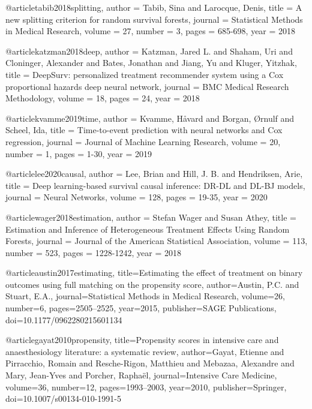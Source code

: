 @article{tabib2018splitting,
  author = {Tabib, Sina and Larocque, Denis},
  title = {A new splitting criterion for random survival forests},
  journal = {Statistical Methods in Medical Research},
  volume = {27},
  number = {3},
  pages = {685-698},
  year = {2018}
}


@article{katzman2018deep,
  author = {Katzman, Jared L. and Shaham, Uri and Cloninger, Alexander and Bates, Jonathan and Jiang, Yu and Kluger, Yitzhak},
  title = {DeepSurv: personalized treatment recommender system using a Cox proportional hazards deep neural network},
  journal = {BMC Medical Research Methodology},
  volume = {18},
  pages = {24},
  year = {2018}
}

@article{kvamme2019time,
  author = {Kvamme, Håvard and Borgan, Ørnulf and Scheel, Ida},
  title = {Time-to-event prediction with neural networks and Cox regression},
  journal = {Journal of Machine Learning Research},
  volume = {20},
  number = {1},
  pages = {1-30},
  year = {2019}
}

@article{lee2020causal,
  author = {Lee, Brian and Hill, J. B. and Hendriksen, Arie},
  title = {Deep learning-based survival causal inference: DR-DL and DL-BJ models},
  journal = {Neural Networks},
  volume = {128},
  pages = {19-35},
  year = {2020}
}

@article{wager2018estimation,
  author = {Stefan Wager and Susan Athey},
  title = {Estimation and Inference of Heterogeneous Treatment Effects Using Random Forests},
  journal = {Journal of the American Statistical Association},
  volume = {113},
  number = {523},
  pages = {1228-1242},
  year = {2018}
}

@article{austin2017estimating,
  title={Estimating the effect of treatment on binary outcomes using full matching on the propensity score},
  author={Austin, P.C. and Stuart, E.A.},
  journal={Statistical Methods in Medical Research},
  volume={26},
  number={6},
  pages={2505--2525},
  year={2015},
  publisher={SAGE Publications},
  doi={10.1177/0962280215601134}
}


@article{gayat2010propensity,
  title={Propensity scores in intensive care and anaesthesiology literature: a systematic review},
  author={Gayat, Etienne and Pirracchio, Romain and Resche-Rigon, Matthieu and Mebazaa, Alexandre and Mary, Jean-Yves and Porcher, Raphaël},
  journal={Intensive Care Medicine},
  volume={36},
  number={12},
  pages={1993--2003},
  year={2010},
  publisher={Springer},
  doi={10.1007/s00134-010-1991-5}
}



